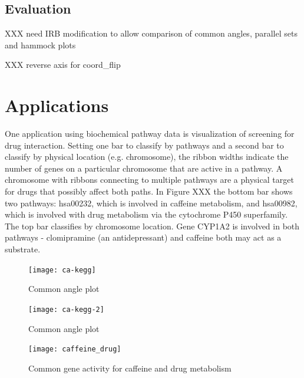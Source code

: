 %


\subsection{Evaluation}
XXX need IRB modification to allow comparison of common angles, parallel sets and hammock plots

XXX reverse axis for coord\_flip

\section{Applications}
One application using biochemical pathway data is visualization of screening for drug interaction. Setting one bar to classify by pathways and a second bar to classify by physical location (e.g. chromosome), the ribbon widths indicate the number of genes on a particular chromosome that are active in a pathway. A chromosome with ribbons connecting to multiple pathways are a physical target for drugs that possibly affect both paths. In Figure XXX the bottom bar shows two pathways: hsa00232, which is involved in caffeine metabolism, and hsa00982, which is involved with drug metabolism via the cytochrome P450 superfamily. The top bar classifies by chromosome location. Gene CYP1A2 is involved in both pathways - clomipramine (an antidepressant) and caffeine both may act as a substrate.
\begin{figure}[htbp] %
   \centering
   \texttt{[image: ca-kegg]} 
   \caption{Common angle plot }
   \label{fig:kegg}
\end{figure}

\begin{figure}[htbp] %
   \centering
   \texttt{[image: ca-kegg-2]} 
   \caption{Common angle plot }
   \label{fig:kegg:2}
\end{figure}

\begin{figure}[htbp] %
   \centering
   \texttt{[image: caffeine\_drug]} 
   \caption{Common gene activity for caffeine and drug metabolism}
   \label{fig:caffeine}
\end{figure}


